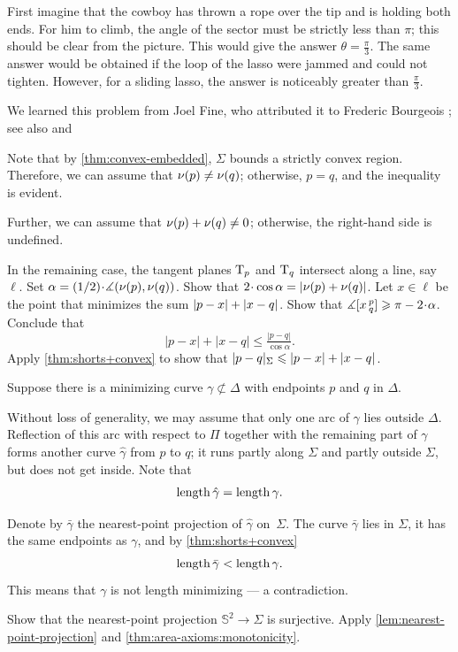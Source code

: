 First imagine that the cowboy has thrown a rope over the tip and is holding both ends.
For him to climb, the angle of the sector must be strictly less than $\pi$; this should be clear from the picture.
This would give the answer $\theta=\tfrac\pi3$.
The same answer would be obtained if the loop of the lasso were jammed and could not tighten.
However, for a sliding lasso, the answer is noticeably greater than $\tfrac\pi3$.

We learned this problem from Joel Fine, who attributed it to Frederic Bourgeois \cite{fine}; see also \cite[Problem 2.10]{morin} and \cite[Problem 12]{khesin-tabachnikov}

Note that by \ref{thm:convex-embedded}, $\Sigma$ bounds a strictly convex region.
Therefore, we can assume that $\nu(p)\ne\nu(q)$; otherwise, $p=q$, and the inequality is evident.

Further, we can assume that $\Norm(p)+\Norm(q)\z\ne 0$; otherwise, the right-hand side is undefined.

In the remaining case, the tangent planes $\mathrm{T}_p$ and $\mathrm{T}_q$ intersect along a line, say $\ell$.
Set $\alpha=\tfrac12\cdot\measuredangle(\Norm(p),\Norm(q))$.
Show that $2\cdot\cos\alpha\z= |\Norm(p)+\Norm(q)|$.
Let $x\in \ell$ be the point that minimizes the sum $|p-x|\z+|x-q|$.
Show that $\measuredangle\hinge xpq\ge \pi-2\cdot\alpha$.
Conclude that 
\[|p-x|+|x-q|\le \tfrac{|p-q|}{\cos\alpha}.\]
Apply \ref{thm:shorts+convex} to show that
$\dist{p}{q}\Sigma\le |p-x|\z+|x-q|$.


Suppose there is a minimizing curve $\gamma\not\subset\Delta$ with endpoints $p$ and $q$ in $\Delta$.

Without loss of generality, we may assume that only one arc of $\gamma$ lies outside $\Delta$.
Reflection of this arc with respect to $\Pi$ together with the remaining part of $\gamma$ forms another curve $\hat\gamma$ from $p$ to $q$;
it runs partly along $\Sigma$ 
and partly outside $\Sigma$,
but does not get inside.
Note that
\[\mathop{\rm length}\nolimits\hat\gamma=\mathop{\rm length}\nolimits\gamma.\]


Denote by $\bar\gamma$ the nearest-point projection of $\hat\gamma$ on~$\Sigma$.
The curve $\bar\gamma$ lies in $\Sigma$, 
it has the same endpoints as $\gamma$,
and by \ref{thm:shorts+convex}
\[\mathop{\rm length}\nolimits\bar\gamma<\mathop{\rm length}\nolimits\gamma.\]
This means that $\gamma$ is not length minimizing --- 
a contradiction.

Show that the nearest-point projection $\mathbb{S}^2\to\Sigma$ is surjective.
Apply \ref{lem:nearest-point-projection} and \ref{thm:area-axioms:monotonicity}.

